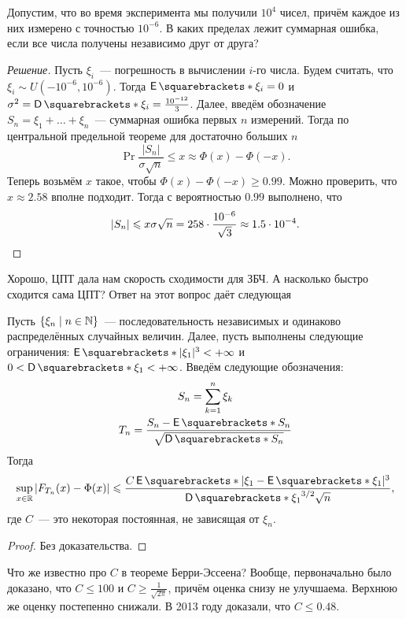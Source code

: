 \begin{example}
	Допустим, что во время эксперимента мы получили \(10^{4}\) чисел, причём 
	каждое из них измерено с точностью \(10^{-6}\). В каких пределах лежит 
	суммарная ошибка, если все числа получены независимо друг от друга?
\end{example}
\begin{proof}[Решение]
	Пусть \(\xi_{i}\)~--- погрешность в вычислении \(i\)-го числа. Будем 
	считать, что \(\xi_{i} \sim U(-10^{-6}, 10^{-6})\). Тогда \(\E{\xi_{i}} = 
	0\) и \(\sigma^2 = \D{\xi_{i}} = \frac{10^{-12}}{3}\). Далее, введём 
	обозначение \(S_n = \xi_{1} + \dots + \xi_{n}\)~--- суммарная ошибка первых 
	\(n\) измерений. Тогда по центральной предельной теореме для достаточно 
	больших \(n\)
	\[
		\Pr{\frac{|S_n|}{\sigma\sqrt{n}} \leq x} \approx \Phi(x) - \Phi(-x).
	\]
	Теперь возьмём \(x\) такое, чтобы \(\Phi(x) - \Phi(-x) \geq 0.99\). Можно 
	проверить, что \(x \approx 2.58\) вполне подходит. Тогда с вероятностью 
	\(0.99\) выполнено, что
	\[
		|S_n| \leq x\sigma\sqrt{n} = 258 \cdot \frac{10^{-6}}{\sqrt{3}} \approx 
		1.5 \cdot 10^{-4}.\qedhere
	\]
\end{proof}

Хорошо, ЦПТ дала нам скорость сходимости для ЗБЧ. А насколько быстро сходится 
сама ЦПТ? Ответ на этот вопрос даёт следующая 
\begin{theorem}
	Пусть \(\{\xi_{n} \mid n \in \N\}\)~--- последовательность независимых и 
	одинаково распределённых случайных величин. Далее, пусть выполнены 
	следующие ограничения: \(\E{|\xi_1|^3} < +\infty\) и \(0 < \D{\xi_1} < 
	+\infty\). Введём следующие обозначения:
	\begin{gather*}
		S_n = \sum_{k = 1}^{n} \xi_{k} \\
		T_n = \frac{S_n - \E{S_n}}{\sqrt{\D{S_n}}}
	\end{gather*}
	Тогда
	\[
		\sup_{x \in \R} \left|F_{T_n}(x) - \Phi(x)\right| \leq 
		\frac{C\E{|\xi_1 - \E{\xi_1}|^3}}{\D{\xi_{1}}^{3/2}\sqrt{n}},
	\]
	где \(C\)~--- это некоторая постоянная, не зависящая от \(\xi_{n}\).
\end{theorem}
\begin{proof}
	Без доказательства.
\end{proof}
Что же известно про \(C\) в теореме Берри-Эссеена? Вообще, первоначально было 
доказано, что \(C \leq 100\) и \(C \geq \frac{1}{\sqrt{2\pi}}\), причём оценка 
снизу не улучшаема. Верхнюю же оценку постепенно снижали. В 2013 году доказали, 
что \(C \leq 0.48\).

